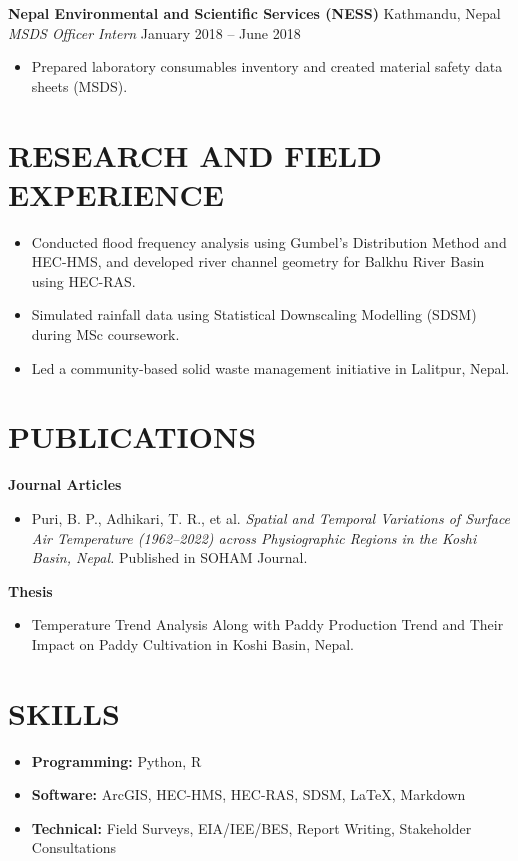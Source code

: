 \documentclass[a4paper,9pt]{extarticle}
\begin{document}
\noindent
\textbf{Nepal Environmental and Scientific Services (NESS)} \hfill Kathmandu, Nepal\\ 
\textit{MSDS Officer Intern} \hfill January 2018 -- June 2018
\begin{itemize}
    \item Prepared laboratory consumables inventory and created material safety data sheets (MSDS).
\end{itemize}

\section*{RESEARCH AND FIELD EXPERIENCE}
\begin{itemize}
    \item Conducted flood frequency analysis using Gumbel’s Distribution Method and HEC-HMS, and developed river channel geometry for Balkhu River Basin using HEC-RAS.
    \item Simulated rainfall data using Statistical Downscaling Modelling (SDSM) during MSc coursework.
    \item Led a community-based solid waste management initiative in Lalitpur, Nepal.
\end{itemize}

\section*{PUBLICATIONS}
\noindent
\textbf{Journal Articles}
\begin{itemize}
    \item Puri, B. P., Adhikari, T. R., et al. \textit{Spatial and Temporal Variations of Surface Air Temperature (1962–2022) across Physiographic Regions in the Koshi Basin, Nepal.} Published in SOHAM Journal.
\end{itemize}

\noindent
\textbf{Thesis}
\begin{itemize}
    \item Temperature Trend Analysis Along with Paddy Production Trend and Their Impact on Paddy Cultivation in Koshi Basin, Nepal.
\end{itemize}

\section*{SKILLS}
\begin{itemize}
    \item \textbf{Programming:} Python, R
    \item \textbf{Software:} ArcGIS, HEC-HMS, HEC-RAS, SDSM, LaTeX, Markdown
    \item \textbf{Technical:} Field Surveys, EIA/IEE/BES, Report Writing, Stakeholder Consultations
\end{itemize}
\end{document}
